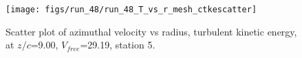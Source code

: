 \begin{figure}[H]
\centering
\texttt{[image: figs/run\_48/run\_48\_T\_vs\_r\_mesh\_ctkescatter]}
\caption{Scatter plot of azimuthal velocity vs radius, turbulent kinetic energy, at $z/c$=9.00, $V_{free}$=29.19, station 5.}
\label{fig:run_48_T_vs_r_mesh_ctkescatter}
\end{figure}


